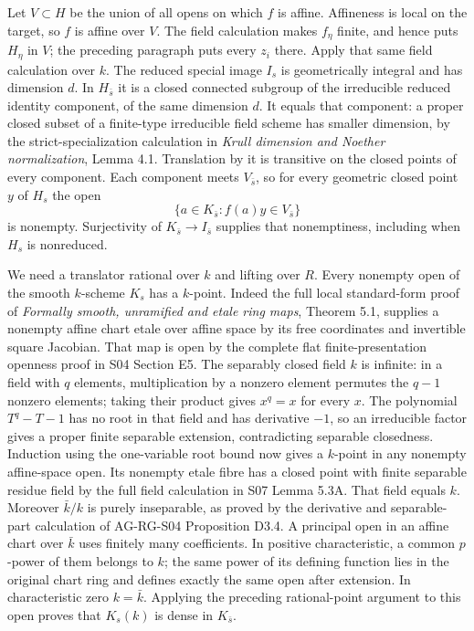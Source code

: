 \documentclass[11pt,a4paper,openany]{report}
\newcounter{none}
\begin{document}
Let \(V\subset H\) be the union of all opens on which \(f\) is affine. Affineness is local on the target, so \(f\) is affine over \(V\). The field calculation makes \(f_\eta\) finite, and hence puts \(H_\eta\) in \(V\); the preceding paragraph puts every \(z_i\) there. Apply that same field calculation over \(k\). The reduced special image \(I_s\) is geometrically integral and has dimension \(d\). In \(H_{\bar s}\) it is a closed connected subgroup of the irreducible reduced identity component, of the same dimension \(d\). It equals that component: a proper closed subset of a finite-type irreducible field scheme has smaller dimension, by the strict-specialization calculation in \emph{Krull dimension and Noether normalization}, Lemma 4.1. Translation by it is transitive on the closed points of every component. Each component meets \(V_{\bar s}\), so for every geometric closed point \(y\) of \(H_s\) the open \[
 \{a\in K_{\bar s}:f(a)y\in V_{\bar s}\}
\] is nonempty. Surjectivity of \(K_{\bar s}\to I_{\bar s}\) supplies that nonemptiness, including when \(H_s\) is nonreduced.

We need a translator rational over \(k\) and lifting over \(R\). Every nonempty open of the smooth \(k\)-scheme \(K_s\) has a \(k\)-point. Indeed the full local standard-form proof of \emph{Formally smooth, unramified and etale ring maps}, Theorem 5.1, supplies a nonempty affine chart etale over affine space by its free coordinates and invertible square Jacobian. That map is open by the complete flat finite-presentation openness proof in S04 Section E5. The separably closed field \(k\) is infinite: in a field with \(q\) elements, multiplication by a nonzero element permutes the \(q-1\) nonzero elements; taking their product gives \(x^q=x\) for every \(x\). The polynomial \(T^q-T-1\) has no root in that field and has derivative \(-1\), so an irreducible factor gives a proper finite separable extension, contradicting separable closedness. Induction using the one-variable root bound now gives a \(k\)-point in any nonempty affine-space open. Its nonempty etale fibre has a closed point with finite separable residue field by the full field calculation in S07 Lemma 5.3A. That field equals \(k\). Moreover \(\bar k/k\) is purely inseparable, as proved by the derivative and separable-part calculation of AG-RG-S04 Proposition D3.4. A principal open in an affine chart over \(\bar k\) uses finitely many coefficients. In positive characteristic, a common \(p\)-power of them belongs to \(k\); the same power of its defining function lies in the original chart ring and defines exactly the same open after extension. In characteristic zero \(k=\bar k\). Applying the preceding rational-point argument to this open proves that \(K_s(k)\) is dense in \(K_{\bar s}\).
\end{document}
